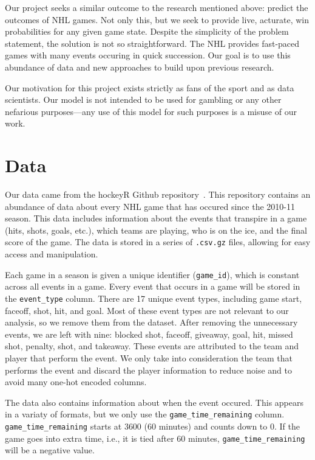 \documentclass[11pt]{article}
\begin{document}
Our project seeks a similar outcome to the research mentioned above: predict the outcomes of NHL games. Not only this,
but we seek to provide live, acturate, win probabilities for any given game state. Despite the simplicity of the problem statement, 
the solution is not so straightforward. The NHL provides fast-paced games with many events
occuring in quick succession. Our goal is to use this abundance of data and new approaches to build upon previous research.

Our motivation for this project exists strictly as fans of the sport and as data scientists. Our model is not intended to be used for gambling or any other
nefarious purposes—any use of this model for such purposes is a misuse of our work.

\section{Data}
Our data came from the hockeyR Github repository~\cite{hockeyR-data}. This repository contains an abundance of data about every NHL game
that has occured since the 2010-11 season. This data includes information about the events that transpire in a game (hits, shots, goals, etc.),
which teams are playing, who is on the ice, and the final score of the game. The data is stored in a series of {\tt .csv.gz} files, allowing for
easy access and manipulation.

Each game in a season is given a unique identifier ({\tt game\_id}), which is constant across all events in a game. Every event that occurs in a game
will be stored in the {\tt event\_type} column. There are 17 unique event types, including game start, faceoff, shot, hit, and goal.
Most of these event types are not relevant to our analysis, so we remove them from the dataset. After removing the unnecessary events, we are left with
nine: blocked shot, faceoff, giveaway, goal, hit, missed shot, penalty, shot, and takeaway. These events are attributed to the
team and player that perform the event. We only take into consideration the team that performs the event and discard the player information to reduce noise and to avoid many one-hot encoded columns.

The data also contains information about when the event occured. This appears in a variaty of formats, but we only
use the {\tt game\_time\_remaining} column. {\tt game\_time\_remaining} starts
at 3600 (60 minutes) and counts down to 0. If the game goes into extra time, i.e., it is tied after 60 minutes, {\tt game\_time\_remaining} will
be a negative value.
\end{document}
